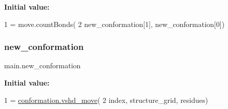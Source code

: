 {\bfseries Initial value\+:}
\begin{DoxyCode}
1 =  move.countBonds(
2                 new\_conformation[1], new\_conformation[0])
\end{DoxyCode}
\mbox{\label{namespacemain_a6eff59da229c3c5e4a58a7d6b48be5bc}} 
\subsubsection{\texorpdfstring{new\+\_\+conformation}{new\_conformation}}
{\footnotesize\ttfamily main.\+new\+\_\+conformation}

{\bfseries Initial value\+:}
\begin{DoxyCode}
1 =  \hyperlink{namespaceconformation_a68e0c087ab604cbc37a7fe9a27622d8c}{conformation.vshd\_move}(
2                 index, structure\_grid, residues)
\end{DoxyCode}
